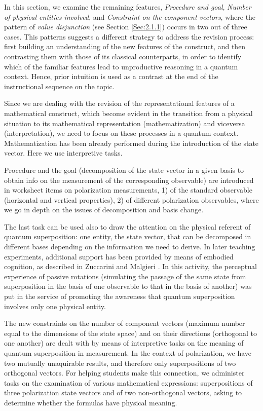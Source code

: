 \documentclass[twocolumn,secnumarabic,amssymb, nobibnotes, aps, prd, nofootinbib]{revtex4-2}
\begin{document}
In this section, we examine the remaining features, \textit{Procedure and goal}, \textit{Number of physical entities involved}, and \textit{Constraint on the component vectors}, where the pattern of \emph{value disjunction} (see Section \ref{Sec:2.1.1}) occurs in two out of three cases. This patterns suggests a different strategy to address the revision process: first building an understanding of the new features of the construct, and then contrasting them with those of its classical counterparts, in order to identify which of the familiar features lead to unproductive reasoning in a quantum context. Hence, prior intuition is used as a contrast at the end of the instructional sequence on the topic.

Since we are dealing with the revision of the representational features of a mathematical construct, which become evident in the transition from a physical situation to its mathematical representation (mathematization) and viceversa (interpretation), we need to focus on these processes in a quantum context. Mathematization has been already performed during the introduction of the state vector. Here we use interpretive tasks.

Procedure and the goal (decomposition of the state vector in a given basis to obtain info on the measurement of the corresponding observable) are introduced in worksheet items on polarization measurements, 1) of the standard observable (horizontal and vertical properties), 2) of different polarization observables, where we go in depth on the issues of decomposition and basis change.

The last task can be used also to draw the attention on the physical referent of quantum superposition: one entity, the state vector, that can be decomposed in different bases depending on the information we need to derive. In later teaching experiments, additional support has been provided by means of embodied cognition, as described in Zuccarini and Malgieri \cite{Zuccarini2022}. In this activity, the perceptual experience of passive rotations (simulating the passage of the same state from superposition in the basis of one observable to that in the basis of another) was put in the service of promoting the awareness that quantum superposition involves only one physical entity.

The new constraints on the number of component vectors (maximum number equal to the dimensions of the state space) and on their directions (orthogonal to one another) are dealt with by means of interpretive tasks on the meaning of quantum superposition in measurement. In the context of polarization, we have two mutually unaquirable results, and therefore only superpositions of two orthogonal vectors. For helping students make this connection, we administer tasks on the examination of various mathematical expressions: superpositions of three polarization state vectors and of two non-orthogonal vectors, asking to determine whether the formulas have physical meaning.
\end{document}
